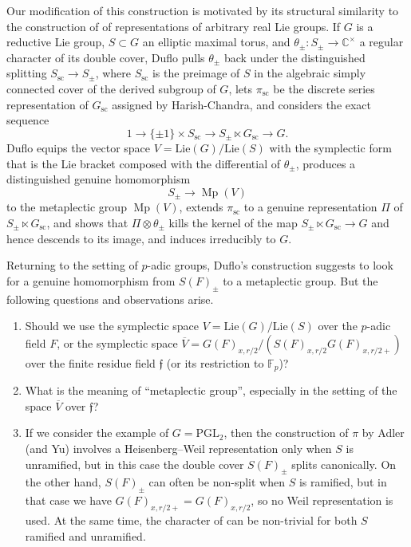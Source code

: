 \documentclass{article}
\def\tx#1{\textrm{#1}}
\def\C{\mathbb{C}}
\def\ol#1{\overline{#1}}
\newcommand{\bF}{\mathbb{F}}
\theoremstyle{definition}
\numberwithin{equation}{subsection}
\renewcommand{\-}{\hyp{}}
\DeclareMathOperator{\Mp}{Mp}
\newcommand{\rf}{\mathfrak{f}}
\newcommand{\oV}{\ol{V}}
\begin{document}
Our modification of this construction is motivated by its structural similarity to the construction of \cite{Duflo82} of representations of arbitrary real Lie groups. If $G$ is a reductive Lie group, $S \subset G$ an elliptic maximal torus, and $\theta_\pm : S_\pm \to \C^\times$ a regular character of its double cover, Duflo pulls $\theta_\pm$ back under the distinguished splitting $S_\mathrm{sc} \to S_\pm$, where $S_\mathrm{sc}$ is the preimage of $S$ in the algebraic simply connected cover of the derived subgroup of $G$, lets $\pi_\mathrm{sc}$ be the discrete series representation of $G_\mathrm{sc}$ assigned by Harish-Chandra, and considers the exact sequence
\[ 1 \to \{\pm1\} \times S_\mathrm{sc}  \to S_\pm \ltimes G_\mathrm{sc}  \to G. \]
Duflo equips the vector space $V=\mathrm{Lie}(G)/\mathrm{Lie}(S)$ with the symplectic form that is the Lie bracket composed with the differential of $\theta_\pm$, produces a distinguished  genuine homomorphism 
\begin{equation} \label{eq:du1}
S_\pm \to \Mp(V)	
\end{equation}
to the metaplectic group $\Mp(V)$,
extends $\pi_\mathrm{sc}$ to a genuine representation $\Pi$ of $S_\pm \ltimes G_\mathrm{sc}$, and shows that $\Pi\otimes\theta_\pm$ kills the kernel of the map $S_\pm \ltimes G_\mathrm{sc}  \to G$ and hence descends to its image, and induces irreducibly to $G$.

Returning to the setting of $p$-adic groups, Duflo's construction suggests to look for a genuine homomorphism from $S(F)_\pm$ to a metaplectic group. But the following questions and observations arise.

\begin{enumerate}
	\item Should we use the  symplectic space $V=\mathrm{Lie}(G)/\mathrm{Lie}(S)$ over the $p$-adic field $F$, or the symplectic space $\oV=G(F)_{x,r/2}/(S(F)_{x,r/2}G(F)_{x,r/2+})$ over the finite residue field $\rf$ (or its restriction to $\bF_p$)?
	\item What is the meaning of ``metaplectic group'', especially in the setting of the space $\oV$ over $\rf$?
	\item If we consider the example of $G=\tx{PGL}_2$, then the construction of $\pi$ by Adler (and Yu) involves a Heisenberg--Weil representation only when $S$ is unramified, but in this case the double cover $S(F)_\pm$ splits canonically. On the other hand, $S(F)_\pm$ can often be non-split when $S$ is ramified, but in that case we have $G(F)_{x,r/2+}=G(F)_{x,r/2}$, so no Weil representation is used. At the same time, the character of \cite{FKS23} can be non-trivial for both $S$ ramified and unramified.
\end{enumerate}
\end{document}

